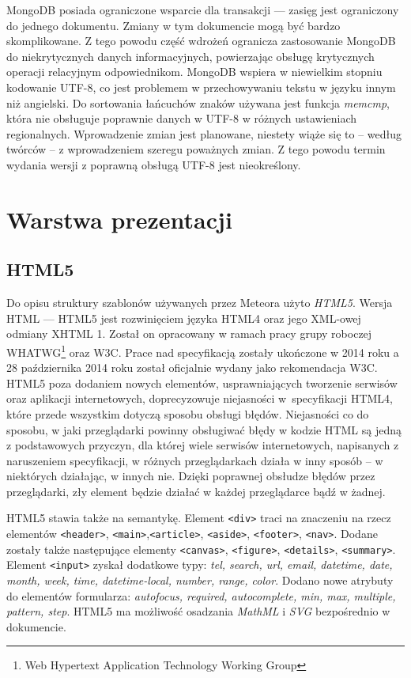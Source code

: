 MongoDB posiada ograniczone wsparcie dla transakcji --- zasięg jest ograniczony do jednego dokumentu. Zmiany w tym dokumencie mogą być bardzo skomplikowane. Z tego powodu część wdrożeń ogranicza zastosowanie MongoDB do niekrytycznych danych informacyjnych, powierzając obsługę krytycznych operacji relacyjnym odpowiednikom. 
MongoDB wspiera w niewielkim stopniu kodowanie UTF-8, co jest problemem w przechowywaniu tekstu w języku innym niż angielski. Do sortowania łańcuchów znaków używana jest funkcja \emph{memcmp}, która nie obsługuje poprawnie danych w UTF-8 w różnych ustawieniach regionalnych. Wprowadzenie zmian jest planowane, niestety wiąże się to -- według twórców -- z wprowadzeniem szeregu poważnych zmian. Z tego powodu termin wydania wersji z poprawną obsługą UTF-8 jest nieokreślony\cite{mongoWiki}.

\section{Warstwa prezentacji}
\subsection{HTML5}

Do opisu struktury szablonów używanych przez Meteora użyto \emph{HTML5}. Wersja HTML --- HTML5 jest rozwinięciem języka HTML4 oraz jego XML-owej odmiany XHTML 1. Został on opracowany w ramach pracy grupy roboczej WHATWG\footnote{Web Hypertext Application Technology Working Group} oraz W3C. Prace nad specyfikacją zostały ukończone w 2014 roku a 28 października 2014 roku został oficjalnie wydany jako rekomendacja W3C. HTML5 poza dodaniem nowych elementów, usprawniających tworzenie serwisów oraz aplikacji internetowych, doprecyzowuje niejasności w~specyfikacji HTML4, które przede wszystkim dotyczą sposobu obsługi błędów. Niejasności co do sposobu, w jaki przeglądarki powinny obsługiwać błędy w kodzie HTML są jedną z podstawowych przyczyn, dla której wiele serwisów internetowych, napisanych z naruszeniem specyfikacji, w różnych przeglądarkach działa w inny sposób -- w niektórych działając, w innych nie. Dzięki poprawnej obsłudze błędów przez przeglądarki, zły element będzie działać w każdej przeglądarce bądź w żadnej. 

HTML5 stawia także na semantykę. Element \verb|<div>| traci na znaczeniu na rzecz elementów \verb|<header>|, \verb|<main>|,\verb|<article>|, \verb|<aside>|, \verb|<footer>|, \verb|<nav>|. Dodane zostały także następujące elementy \verb|<canvas>|, \verb|<figure>|, \verb|<details>|, \verb|<summary>|. Element \verb|<input>| zyskał dodatkowe typy: \textit{tel, search, url, email, datetime, date, month, week, time, datetime-local, number, range, color}. Dodano nowe atrybuty do elementów formularza: \textit{autofocus, required, autocomplete, min, max, multiple, pattern, step}. HTML5 ma możliwość osadzania \emph{MathML} i \emph{SVG} bezpośrednio w dokumencie\cite{htmlWiki}.

